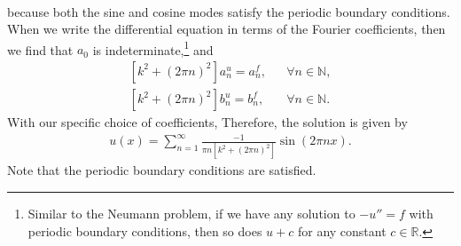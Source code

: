 \documentclass[11pt]{article}
\begin{document}
\begin{solution}
\begin{enumerate}
\begin{align*}
        \end{align*}
        because both the sine and cosine modes satisfy the periodic boundary conditions. 
        When we write the differential equation in terms of the Fourier coefficients, then we find that $a_0$ is indeterminate,\footnote{Similar to the Neumann problem, if we have any solution to $-u'' = f$ with periodic boundary conditions, then so does $u+c$ for any constant $c \in \mathbb R$.} 
        and 
        \begin{align*}
            \left [k^2 + (2 \pi n)^2 \right] a^{u}_{n} = a^{f}_{n}, & & \forall n \in \mathbb{N}
            ,
            \\ 
            \left [k^2 + (2 \pi n)^2 \right] b^{u}_{n} = b^{f}_{n}, & & \forall n \in \mathbb{N}
            .
        \end{align*}
        With our specific choice of coefficients, 
        Therefore, the solution is given by
        \begin{align*}
            u(x) = \sum_{n=1}^{\infty} \frac{-1}{\pi n \left[k^2 + (2 \pi n)^2 \right]} \sin(2 \pi n x).
        \end{align*}
        Note that the periodic boundary conditions are satisfied.
    \end{enumerate}
\end{solution}



% 
\end{document}
